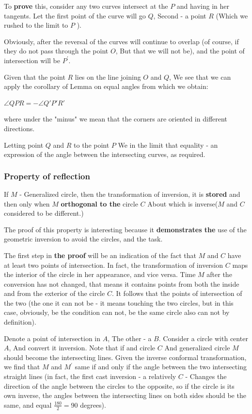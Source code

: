 To \textbf{prove} this, consider any two curves intersect at the $P$ and having in her tangents. Let the first point of the curve will go $Q$, Second - a point $R$ (Which we rushed to the limit to $P$ ).

Obviously, after the reversal of the curves will continue to overlap (of course, if they do not pass through the point $O$, But that we will not be), and the point of intersection will be $P ^ \prime$.

Given that the point $R$ lies on the line joining $O$ and $Q$, We see that we can apply the corollary of Lemma on equal angles from which we obtain:

$\angle QPR=-\angle Q'P'R'$

where under the "minus" we mean that the corners are oriented in different directions.

Letting point $Q$ and $R$ to the point $P$ We in the limit that equality - an expression of the angle between the intersecting curves, as required.

\subsubsection{ Property of reflection }

If $M$ - Generalized circle, then the transformation of inversion, it is \textbf{stored} and then only when $M$ \textbf{orthogonal to the} circle $C$ About which is inverse($M$ and $C$ considered to be different.)

The proof of this property is interesting because it \textbf{demonstrates the} use of the geometric inversion to avoid the circles, and the task.

The first step in \textbf{the proof} will be an indication of the fact that $M$ and $C$ have at least two points of intersection. In fact, the transformation of inversion $C$ maps the interior of the circle in her appearance, and vice versa. Time $M$ after the conversion has not changed, that means it contains points from both the inside and from the exterior of the circle $C$. It follows that the points of intersection of the two (the one it can not be - it means touching the two circles, but in this case, obviously, be the condition can not, be the same circle also can not by definition).

Denote a point of intersection in $A$, The other - a $B$. Consider a circle with center $A$, And convert it inversion. Note that if and circle $C$ And generalized circle $M$ should become the intersecting lines. Given the inverse conformal transformation, we find that $M$ and $M ^ \prime$ same if and only if the angle between the two intersecting straight lines (in fact, the first cast inversion - a relatively $C$ - Changes the direction of the angle between the circles to the opposite, so if the circle is its own inverse, the angles between the intersecting lines on both sides should be the same, and equal $\frac {180} {2} = 90$ degrees).

